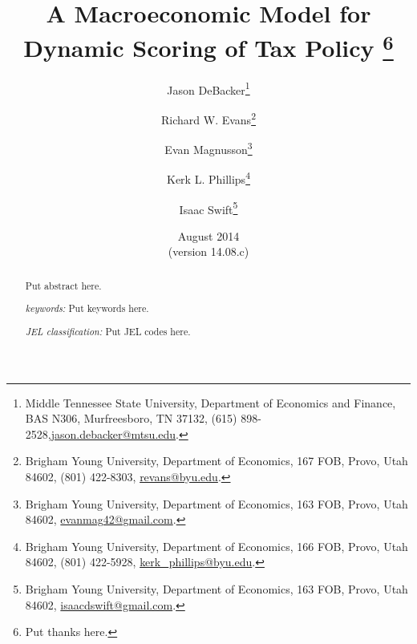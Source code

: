 \documentclass[letterpaper,12pt]{article}
\theoremstyle{definition}
\begin{document}
\begin{titlepage}
\title{A Macroeconomic Model for \\
       Dynamic Scoring of Tax Policy
       \thanks{
       Put thanks here.}
       }
\author{
  Jason DeBacker\footnote{Middle Tennessee State University, Department of Economics and Finance, BAS N306, Murfreesboro, TN 37132, (615) 898-2528,\href{mailto:jason.debacker@mtsu.edu}{jason.debacker@mtsu.edu}.} \\[-2pt]
  \and
  Richard W. Evans\footnote{Brigham Young University, Department of Economics, 167 FOB, Provo, Utah 84602, (801) 422-8303, \href{mailto:revans@byu.edu}{revans@byu.edu}.} \\[-2pt]
  \and
  Evan Magnusson\footnote{Brigham Young University, Department of Economics, 163 FOB, Provo, Utah 84602, \href{mailto:evanmag42@gmail.com}{evanmag42@gmail.com}.} \\[-2pt]
  \and
  Kerk L. Phillips\footnote{Brigham Young University, Department of Economics, 166 FOB, Provo, Utah 84602, (801) 422-5928, \href{mailto:kerk_phillips@byu.edu}{kerk\_phillips@byu.edu}.} \\[-2pt]
  \and
  Isaac Swift\footnote{Brigham Young University, Department of Economics, 163 FOB, Provo, Utah 84602, \href{mailto:isaacdswift@gmail.com}{isaacdswift@gmail.com}.} \\[-2pt]}
\date{August 2014 \\
  \scriptsize{(version 14.08.c)}}
\maketitle
\begin{abstract}
\normalsize{Put abstract here.

\vspace{3mm}

\noindent\textit{keywords:}\: Put keywords here.

\vspace{3mm}

\noindent\textit{JEL classification:} Put JEL codes here.}
\end{abstract}
\thispagestyle{empty}
\end{titlepage}
\end{document}
